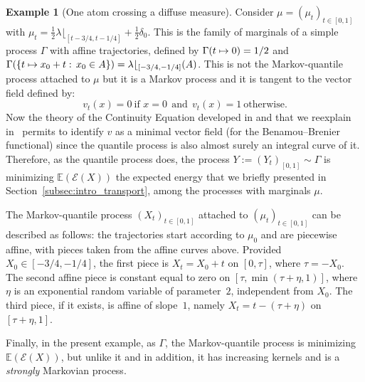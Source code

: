 \documentclass[JEP,XML,SOM,Unicode,NoEqCountersInSection,NoFloatCountersInSection,published]{cedram}
\newcommand\mto{\mathchoice{\longmapsto}{\mapsto}{\mapsto}{\mapsto}}
\theoremstyle{plain}
\theoremstyle{definition}
\newtheorem{ex}[them]{Example}
\newcommand{\EE}{{\mathcal E}}
\newcommand{\E}{\mathbb{E}}
\begin{document}
\begin{ex}[One atom crossing a diffuse measure]\label{ex:strongmarkov}
Consider $\mu=(\mu_t)_{t\in [0,1]}$ with $\mu_t=\frac12 \lambda\lfloor_{[t-3/4,t-1/4]}+\frac12 \delta_{0}$. This is the family of marginals of a simple process $\Gamma$ with affine trajectories, defined by $\Gamma(t\mto 0)=1/2$ and $\Gamma(\{t\mto x_0+t:\,x_0\in A\})=\lambda\lfloor_{[-3/4,-1/4]}(A)$. This is not the Markov-quantile process attached to $\mu$ but it is a Markov process and it is tangent to the vector field defined by:
\[v_t(x)=0\ \text{if }x=0\ \ \text{and}\ \ v_t(x)=1\ \text{otherwise.}\]
Now the theory of the Continuity Equation developed in \cite{AGS} and that we reexplain in~\cite{BouJui2} permits to identify $v$ as a minimal vector field (for the Benamou--Brenier functional) since the quantile process is also almost surely an integral curve of it. Therefore, as the quantile process does, the process $Y:=(Y_t)_{[0,1]}\sim\Gamma$ is minimizing $\E(\EE(X))$ the expected energy that we briefly presented in Section~\ref{subsec:intro_transport}, among the processes with marginals $\mu$.

The Markov-quantile process $(X_t)_{t\in [0,1]}$ attached to $(\mu_t)_{t\in[0,1]}$ can be described as follows: the trajectories start according to $\mu_0$ and are piecewise affine, with pieces taken from the affine curves above. Provided $X_0\in [-3/4,-1/4]$, the first piece is $X_t=X_0+t$ on $[0,\tau]$, where $\tau=-X_0$. The second affine piece is constant equal to zero on $[\tau,\min(\tau+\eta,1)]$, where $\eta$ is an exponential random variable of parameter~$2$, independent from $X_0$. The third piece, if it exists, is affine of slope~$1$, namely $X_t=t-(\tau+\eta)$ on $[\tau+\eta,1]$.

Finally, in the present example, as $\Gamma$, the Markov-quantile process is minimizing $\E(\EE(X))$, but unlike it and in addition, it has increasing kernels and is a \emph{strongly} Markovian process.
\end{ex}
\end{document}

